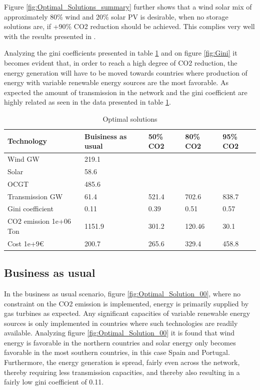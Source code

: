 Figure \ref{fig:Optimal_Solutions_summary} further shows that a wind solar mix of approximately 80\% wind and 20\% solar PV is desirable, when no storage solutions are, if +90\% CO2 reduction should be achieved. This complies very well with the results presented in \cite{rasmussen2011a}. 


Analyzing the gini coefficients presented in table \ref{tab:Optimal_Solutions_summary} and on figure \ref{fig:Gini} it becomes evident that, in order to reach a high degree of CO2 reduction, the energy generation will have to be moved towards countries where production of energy with variable renewable energy sources are the most favorable. As expected the amount of transmission in the network and the gini coefficient are highly related as seen in the data presented in table \ref{tab:Optimal_Solutions_summary}. 



\begin{table}[h]
	\caption{Optimal solutions }
	\label{tab:Optimal_Solutions_summary}
	\begin{tabular}{l|llll}
		Technology       & Buisiness as usual & 50\% CO2  & 80\% CO2  & 95\% CO2  \\ \hline
		Wind      GW       &219.1              &              &                    &                    \\
		Solar            &58.6                     &                    &                    &                    \\
		OCGT             &485.6                    &                    &                    &                    \\
		Transmission GW     &61.4  & 521.4   & 702.6    &     838.7                 \\
		Gini coefficient &0.11   & 0.39  & 0.51                   &  0.57           \\
		CO2 emission 1e+06 Ton& 1151.9            & 301.2         & 120.46             &     30.1               \\
		Cost 1e+9€       &200.7  & 265.6    &  329.4    &  458.8           
	\end{tabular}
\end{table}

\subsection{Business as usual}
In the business as usual scenario, figure \ref{fig:Optimal_Solution_00}, where no constraint on the CO2 emission is implemented, energy is primarily supplied by gas turbines as expected. Any significant capacities of variable renewable energy sources is only implemented in countries where such technologies are readily available. Analyzing figure \ref{fig:Optimal_Solution_00} it is found that wind energy is favorable in the northern countries and solar energy only becomes favorable in the most southern countries, in this case Spain and Portugal. 
Furthermore, the energy generation is spread, fairly even across the network, thereby requiring less transmission capacities, and thereby also resulting in a fairly low gini coefficient of 0.11. 

